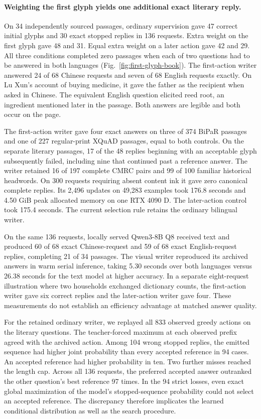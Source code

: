 \paragraph{Weighting the first glyph yields one additional exact literary reply.}
On 34 independently sourced passages, ordinary supervision gave 47 correct initial glyphs and 30 exact stopped replies in 136 requests. Extra weight on the first glyph gave 48 and 31. Equal extra weight on a later action gave 42 and 29. All three conditions completed zero passages when each of two questions had to be answered in both languages (Fig.~\ref{fig:first-glyph-book}). The first-action writer answered 24 of 68 Chinese requests and seven of 68 English requests exactly. On Lu Xun's account of buying medicine, it gave the father as the recipient when asked in Chinese. The equivalent English question elicited reed root, an ingredient mentioned later in the passage. Both answers are legible and both occur on the page.

The first-action writer gave four exact answers on three of 374 BiPaR passages and one of 227 regular-print XQuAD passages, equal to both controls. On the separate literary passages, 17 of the 48 replies beginning with an acceptable glyph subsequently failed, including nine that continued past a reference answer. The writer retained 16 of 197 complete CMRC pairs and 99 of 100 familiar historical headwords. On 300 requests requiring absent content ink it gave zero canonical complete replies. Its 2,496 updates on 49,283 examples took 176.8 seconds and 4.50 GiB peak allocated memory on one RTX 4090 D. The later-action control took 175.4 seconds. The current selection rule retains the ordinary bilingual writer.

On the same 136 requests, locally served Qwen3-8B Q8 received text and produced 60 of 68 exact Chinese-request and 59 of 68 exact English-request replies, completing 21 of 34 passages. The visual writer reproduced its archived answers in warm serial inference, taking 5.30 seconds over both languages versus 26.38 seconds for the text model at higher accuracy. In a separate eight-request illustration where two households exchanged dictionary counts, the first-action writer gave six correct replies and the later-action writer gave four. These measurements do not establish an efficiency advantage at matched answer quality.

For the retained ordinary writer, we replayed all 833 observed greedy actions on the literary questions. The teacher-forced maximum at each observed prefix agreed with the archived action. Among 104 wrong stopped replies, the emitted sequence had higher joint probability than every accepted reference in 94 cases. An accepted reference had higher probability in ten. Two further misses reached the length cap. Across all 136 requests, the preferred accepted answer outranked the other question's best reference 97 times. In the 94 strict losses, even exact global maximization of the model's stopped-sequence probability could not select an accepted reference. The discrepancy therefore implicates the learned conditional distribution as well as the search procedure.
